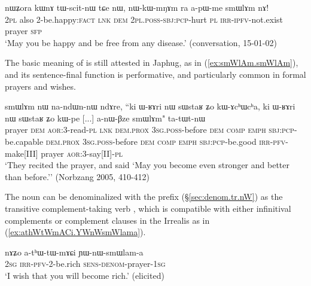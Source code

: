 \begin{exe}
	\ex \label{ex:tWscitnW.nWkWmNAm.smWlAm}
	\gll    nɯʑora kɯnɤ tɯ-scit-nɯ tɕe nɯ, nɯ-kɯ-mŋɤm ra a-pɯ-me smɯlɤm nɤ! \\
	\textsc{2pl} also 2-be.happy:\textsc{fact} \textsc{lnk} \textsc{dem} \textsc{2pl}.\textsc{poss}-\textsc{sbj}:\textsc{pcp}-hurt \textsc{pl} \textsc{irr}-\textsc{ipfv}-not.exist prayer \textsc{sfp} \\
	\glt `May you be happy and be free from any disease.' (conversation, 15-01-02)
\end{exe}

The basic meaning of   is still attested in Japhug, as in (\ref{ex:smWlAm.smWlAm}), and its sentence-final function is performative, and particularly common in formal prayers and wishes.

\begin{exe}
	\ex \label{ex:smWlAm.smWlAm}
	\gll    smɯlɤm nɯ na-ndɯn-nɯ ndɤre, ``ki ɯ-ʁɤri nɯ sɯstaʁ ʑo kɯ-ɤcʰɯcʰa, ki ɯ-ʁɤri nɯ sɯstaʁ ʑo kɯ-pe [...] a-nɯ-βze smɯlɤm" ta-tɯt-nɯ \\
	prayer \textsc{dem} \textsc{aor}:3\flobv{}-read-\textsc{pl}  \textsc{lnk} \textsc{dem}.\textsc{prox} \textsc{3sg}.\textsc{poss}-before \textsc{dem} \textsc{comp} \textsc{emph} \textsc{sbj}:\textsc{pcp}-be.capable \textsc{dem}.\textsc{prox} \textsc{3sg}.\textsc{poss}-before  \textsc{dem} \textsc{comp}  \textsc{emph} \textsc{sbj}:\textsc{pcp}-be.good  {   } \textsc{irr}-\textsc{pfv}-make[III] prayer  \textsc{aor}:3\flobv{}-say[II]-\textsc{pl} \\
	\glt `They recited the prayer, and said `May you become even stronger and better than before.'' (Norbzang 2005, 410-412)
\end{exe}  

The noun  can be denominalized with the prefix  (§\ref {sec:denom.tr.nW}) as the transitive complement-taking verb , which is compatible with either infinitival complements or complement clauses in the Irrealis as in (\ref{ex:athWtWmACi.YWnWsmWlama}).

\begin{exe}
	\ex \label{ex:athWtWmACi.YWnWsmWlama}
	\gll  nɤʑo a-tʰɯ-tɯ-mɤɕi  ɲɯ-nɯ-smɯlam-a \\
	\textsc{2sg} \textsc{irr}-\textsc{pfv}-2-be.rich \textsc{sens}-\textsc{denom}-prayer-\textsc{1sg} \\
	\glt `I wish that you will become rich.' (elicited)
\end{exe}  
